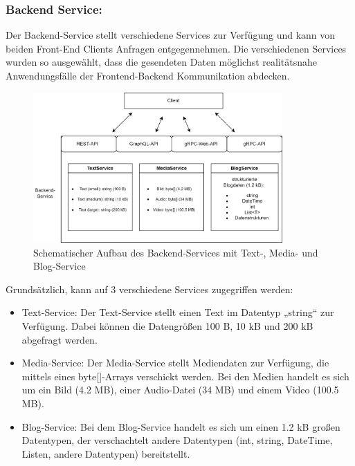 \subsubsection*{Backend Service:}
Der Backend-Service stellt verschiedene Services zur Verfügung und kann von beiden Front-End Clients Anfragen entgegennehmen.
Die verschiedenen Services wurden so ausgewählt, dass die gesendeten Daten möglichst realitätsnahe Anwendungsfälle der Frontend-Backend Kommunikation abdecken.

\begin{figure}[htbp]
	\centering
	\includegraphics[width=0.85\textwidth]{images/BackendService.png}
	\caption{Schematischer Aufbau des Backend-Services mit Text-, Media- und Blog-Service}
	\label{fig:backendservice}
\end{figure}

Grundsätzlich, kann auf 3 verschiedene Services zugegriffen werden:

\begin{itemize}
	\item Text-Service: 
	Der Text-Service stellt einen Text im Datentyp „string“ zur Verfügung. Dabei können die Datengrößen 100 B, 10 kB und 200 kB abgefragt werden.
	
	\item Media-Service:
	Der Media-Service stellt Mediendaten zur Verfügung, die mittels eines byte[]-Arrays verschickt werden. Bei den Medien handelt es sich um ein Bild (4.2 MB), einer Audio-Datei (34 MB) und einem Video (100.5 MB). 
	
	\item Blog-Service: 
	Bei dem Blog-Service handelt es sich um einen 1.2 kB großen Datentypen, der verschachtelt andere Datentypen (int, string, DateTime, Listen, andere Datentypen) bereitstellt.
	
\end{itemize}

